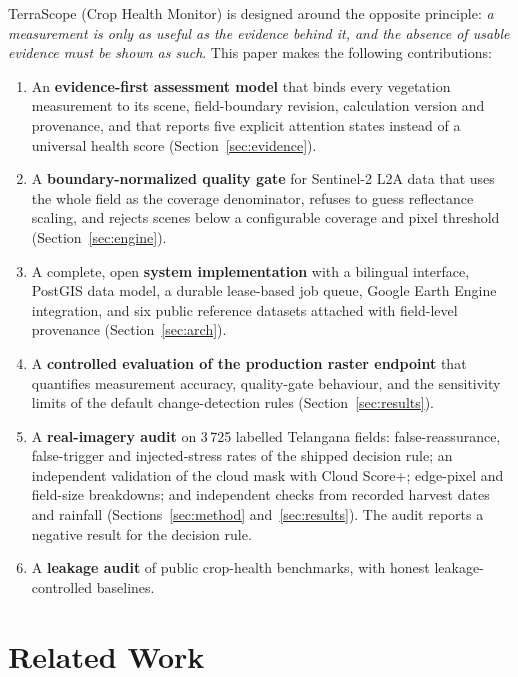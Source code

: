 \documentclass[conference]{IEEEtran}
\begin{document}
TerraScope (Crop Health Monitor) is designed around the opposite principle: \emph{a measurement is only as useful as the evidence behind it, and the absence of usable evidence must be shown as such}. This paper makes the following contributions:
\begin{enumerate}
  \item An \textbf{evidence-first assessment model} that binds every vegetation measurement to its scene, field-boundary revision, calculation version and provenance, and that reports five explicit attention states instead of a universal health score (Section~\ref{sec:evidence}).
  \item A \textbf{boundary-normalized quality gate} for Sentinel-2 L2A data that uses the whole field as the coverage denominator, refuses to guess reflectance scaling, and rejects scenes below a configurable coverage and pixel threshold (Section~\ref{sec:engine}).
  \item A complete, open \textbf{system implementation} with a bilingual interface, PostGIS data model, a durable lease-based job queue, Google Earth Engine integration, and six public reference datasets attached with field-level provenance (Section~\ref{sec:arch}).
  \item A \textbf{controlled evaluation of the production raster endpoint} that quantifies measurement accuracy, quality-gate behaviour, and the sensitivity limits of the default change-detection rules (Section~\ref{sec:results}).
  \item A \textbf{real-imagery audit} on 3\,725 labelled Telangana fields: false-reassurance, false-trigger and injected-stress rates of the shipped decision rule; an independent validation of the cloud mask with Cloud Score+; edge-pixel and field-size breakdowns; and independent checks from recorded harvest dates and rainfall (Sections~\ref{sec:method} and~\ref{sec:results}). The audit reports a negative result for the decision rule.
  \item A \textbf{leakage audit} of public crop-health benchmarks, with honest leakage-controlled baselines.
\end{enumerate}

\section{Related Work}
\end{document}
